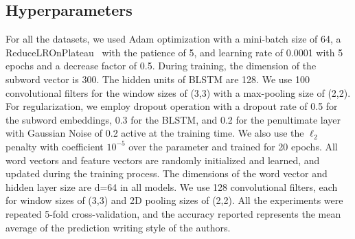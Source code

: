 \documentclass[conference]{IEEEtran}
\begin{document}
\subsection{Hyperparameters}\label{sec4.2}
For all the datasets, we used Adam optimization \cite{kingad2015methodforstochasticoptimization} with a mini-batch size of 64, a ReduceLROnPlateau~\cite{Gabruseva_2020_CVPR_Workshops} with the patience of 5, and learning rate of 0.0001 with 5 epochs and a decrease factor of 0.5. During training, the dimension of the subword vector is 300. The hidden units of BLSTM are 128. We use 100 convolutional filters for the window sizes of (3,3) with a max-pooling size of (2,2). For regularization, we employ dropout operation with a dropout rate of 0.5 for the subword embeddings, 0.3 for the BLSTM, and 0.2 for the penultimate layer with Gaussian Noise of 0.2 active at the training time. We also use the $\ell_2$ penalty with coefficient $10^{-5}$ over the parameter and trained for 20 epochs. All word vectors and feature vectors are randomly initialized and learned, and updated during the training process. The dimensions of the word vector and hidden layer size are d=64 in all models. We use 128 convolutional filters, each for window sizes of (3,3) and 2D pooling sizes of (2,2). All the experiments were repeated 5-fold cross-validation, and the accuracy reported represents the mean average of the prediction writing style of the authors.
\end{document}
